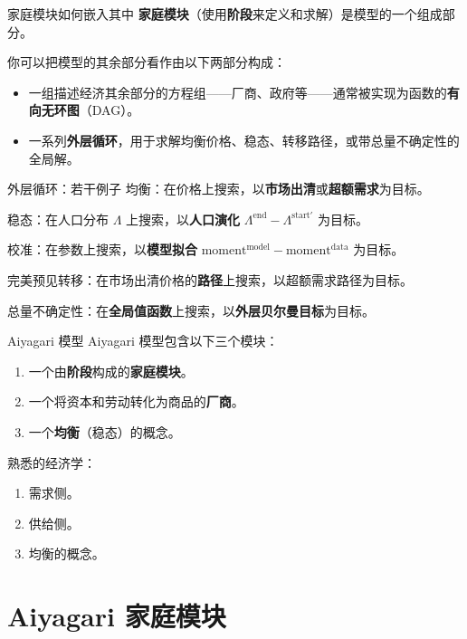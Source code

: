 \documentclass[10pt,aspectratio=169]{beamer}
\begin{document}
\begin{frame}{家庭模块如何嵌入其中}
  \textbf{家庭模块}（使用\textbf{阶段}来定义和求解）是模型的一个组成部分。

  你可以把模型的其余部分看作由以下两部分构成：
  \begin{itemize}
    \item 一组描述经济其余部分的方程组——厂商、政府等——通常被实现为函数的\textbf{有向无环图}（DAG）。
    \item 一系列\textbf{外层循环}，用于求解均衡价格、稳态、转移路径，或带总量不确定性的全局解。
  \end{itemize}
\end{frame}

\begin{frame}{外层循环：若干例子}
  均衡：在价格上搜索，以\textbf{市场出清}或\textbf{超额需求}为目标。

  稳态：在人口分布 $\Lambda$ 上搜索，以\textbf{人口演化} $\Lambda^\text{end} - \Lambda^{\text{start}'}$ 为目标。

  校准：在参数上搜索，以\textbf{模型拟合} $\text{moment}^\text{model} - \text{moment}^\text{data}$ 为目标。

  完美预见转移：在市场出清价格的\textbf{路径}上搜索，以超额需求路径为目标。

  总量不确定性：在\textbf{全局值函数}上搜索，以\textbf{外层贝尔曼目标}为目标。
\end{frame}

\begin{frame}{Aiyagari 模型}
  Aiyagari 模型包含以下三个模块：
  \begin{enumerate}
    \item 一个由\textbf{阶段}构成的\textbf{家庭模块}。
    \item 一个将资本和劳动转化为商品的\textbf{厂商}。
    \item 一个\textbf{均衡}（稳态）的概念。
  \end{enumerate}

  熟悉的经济学：
  \begin{enumerate}
    \item 需求侧。
    \item 供给侧。
    \item 均衡的概念。
  \end{enumerate}
\end{frame}

\section{Aiyagari 家庭模块}
\end{document}

